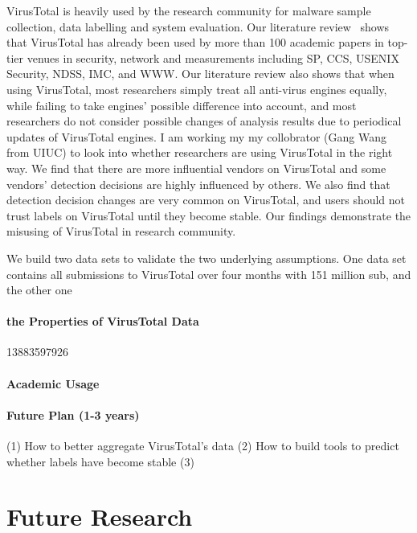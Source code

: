 \documentclass[10pt]{article}
\begin{document}
VirusTotal is heavily used by the research community for malware sample collection,
data labelling and system evaluation. 
Our literature review~\cite{vt-jianjun} shows that 
VirusTotal has already been used by more than 100 academic 
papers in top-tier venues 
in security, network and measurements including SP, CCS, 
USENIX Security, NDSS, IMC, and WWW.
Our literature review also shows that when using VirusTotal, 
most researchers simply treat all anti-virus engines equally, 
while failing to take engines' possible difference into account, 
and most researchers do not consider possible changes of analysis results due to 
periodical updates of VirusTotal engines. 
I am working my my collobrator (Gang Wang from UIUC) to look into whether 
researchers are using VirusTotal in the right way. 
We find that 
there are more influential vendors on VirusTotal and some vendors' 
detection decisions are highly influenced by others. 
We also find that detection decision changes are very common on VirusTotal,
and users should not trust labels on VirusTotal until they become stable. 
Our findings demonstrate the misusing of VirusTotal 
in research community.




We build two data sets to validate the two underlying assumptions. 
One data set contains all submissions to VirusTotal over four months with 151 million sub, 
and the other one  


\vspace{-.1in}
\paragraph{the Properties of VirusTotal Data}
13883597926


\vspace{-.1in}
\paragraph{Academic Usage} 



\vspace{-.1in}
\paragraph{Future Plan (1-3 years)}
(1) How to better aggregate VirusTotal's data
(2) How to build tools to predict whether labels have become stable
(3)

\section{Future Research}
\end{document}
